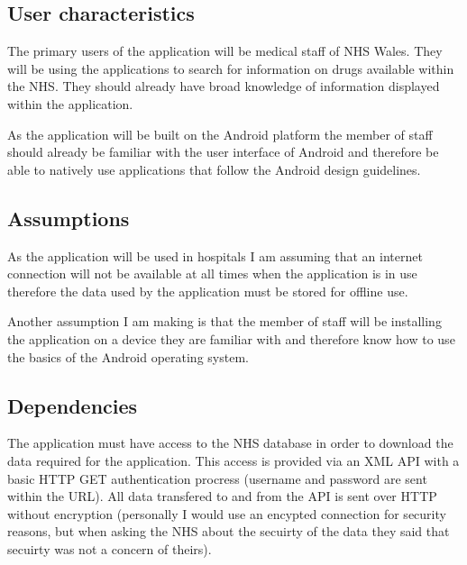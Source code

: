 \documentclass[11pt,fleqn,twoside]{article}
\begin{document}
\subsection{User characteristics}
The primary users of the application will be medical staff of NHS Wales. They will be using the applications to search for information on drugs available within the NHS. They should already have broad knowledge of information displayed within the application. 

As the application will be built on the Android platform the member of staff should already be familiar with the user interface of Android and therefore be able to natively use applications that follow the Android design guidelines.

\subsection{Assumptions}
As the application will be used in hospitals I am assuming that an internet connection will not be available at all times when the application is in use therefore the data used by the application must be stored for offline use.

Another assumption I am making is that the member of staff will be installing the application on a device they are familiar with and therefore know how to use the basics of the Android operating system.

\subsection{Dependencies}
The application must have access to the NHS database in order to download the data required for the application. This access is provided via an XML API with a basic HTTP GET authentication procress (username and password are sent within the URL). All data transfered to and from the API is sent over HTTP without encryption (personally I would use an encypted connection for security reasons, but when asking the NHS about the secuirty of the data they said that secuirty was not a concern of theirs).
\end{document}

